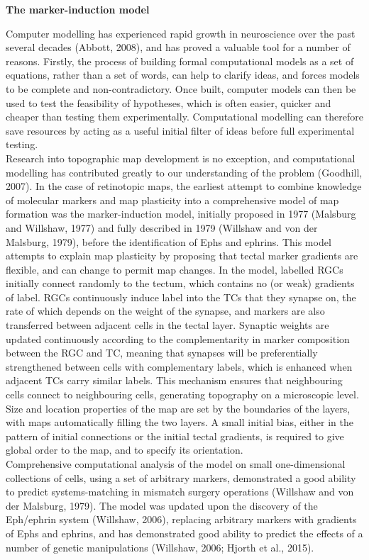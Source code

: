 \documentclass[11pt]{"article"}
\begin{document}
\pagebreak

\textbf{The marker-induction model}

{
Computer modelling has experienced rapid growth in neuroscience over the past several decades (Abbott, 2008), and has proved a valuable tool for a number of reasons. Firstly, the process of building formal computational models as a set of equations, rather than a set of words, can help to clarify ideas, and forces models to be complete and non-contradictory. Once built, computer models can then be used to test the feasibility of hypotheses, which is often easier, quicker and cheaper than testing them experimentally. Computational modelling can therefore save resources by acting as a useful initial filter of ideas before full experimental testing. 
\\

Research into topographic map development is no exception, and computational modelling has contributed greatly to our understanding of the problem (Goodhill, 2007). In the case of retinotopic maps, the earliest attempt to combine knowledge of molecular markers and map plasticity into a comprehensive model of map formation was the marker-induction model, initially proposed in 1977 (Malsburg and Willshaw, 1977) and fully described in 1979 (Willshaw and von der Malsburg, 1979), before the identification of Ephs and ephrins. This model attempts to explain map plasticity by proposing that tectal marker gradients are flexible, and can change to permit map changes. In the model, labelled RGCs initially connect randomly to the tectum, which contains no (or weak) gradients of label. RGCs continuously induce label into the TCs that they synapse on, the rate of which depends on the weight of the synapse, and markers are also transferred between adjacent cells in the tectal layer. Synaptic weights are updated continuously according to the complementarity in marker composition between the RGC and TC, meaning that synapses will be preferentially strengthened between cells with complementary labels, which is enhanced when adjacent TCs carry similar labels. This mechanism ensures that neighbouring cells connect to neighbouring cells, generating topography on a microscopic level. Size and location properties of the map are set by the boundaries of the layers, with maps automatically filling the two layers. A small initial bias, either in the pattern of initial connections or the initial tectal gradients, is required to give global order to the map, and to specify its orientation.
\\

Comprehensive computational analysis of the model on small one-dimensional collections of cells, using a set of arbitrary markers, demonstrated a good ability to predict systems-matching in mismatch surgery operations (Willshaw and von der Malsburg, 1979). The model was updated upon the discovery of the Eph/ephrin system (Willshaw, 2006), replacing arbitrary markers with gradients of Ephs and ephrins, and has demonstrated good ability to predict the effects of a number of genetic manipulations (Willshaw, 2006; Hjorth et al., 2015).
\par
}
\end{document}
